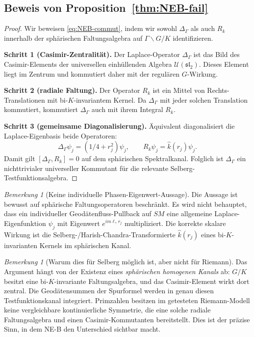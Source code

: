 \documentclass[12pt,a4paper]{article}
\theoremstyle{definition}
\theoremstyle{remark}
\newtheorem{remark}[theorem]{Bemerkung}
\newcommand{\Delop}{\Delta_{\Gamma}}
\begin{document}
\subsection{\texorpdfstring{Beweis von Proposition~\ref{thm:NEB-fail}}{Beweis von Proposition 5.1}}

\begin{proof}
Wir beweisen \eqref{eq:NEB-commut}, indem wir sowohl $\Delop$ als auch $R_k$
innerhalb der sphärischen Faltungsalgebra auf $\Gamma\backslash G/K$
identifizieren.

\smallskip\noindent
\textbf{Schritt 1 (Casimir-Zentralität).} Der Laplace-Operator $\Delop$ ist
das Bild des Casimir-Elements der universellen einhüllenden Algebra
$\mathcal{U}(\mathfrak{sl}_2)$. Dieses Element liegt im Zentrum und kommutiert
daher mit der regulären $G$-Wirkung.

\smallskip\noindent
\textbf{Schritt 2 (radiale Faltung).} Der Operator $R_k$ ist ein Mittel von
Rechts-Translationen mit bi-$K$-invariantem Kernel. Da $\Delop$ mit jeder
solchen Translation kommutiert, kommutiert $\Delop$ auch mit ihrem Integral
$R_k$.

\smallskip\noindent
\textbf{Schritt 3 (gemeinsame Diagonalisierung).} Äquivalent diagonalisiert die
Laplace-Eigenbasis beide Operatoren:
\[
\Delop\psi_j=(1/4+r_j^2)\psi_j,\qquad R_k\psi_j=\widehat{k}(r_j)\psi_j.
\]
Damit gilt $[\Delop,R_k]=0$ auf dem sphärischen Spektralkanal. Folglich ist
$\Delop$ ein nichttrivialer universeller Kommutant für die relevante
Selberg-Testfunktionsalgebra.
\end{proof}

\begin{remark}[Keine individuelle Phasen-Eigenwert-Aussage]
Die Aussage ist bewusst auf sphärische Faltungsoperatoren beschränkt.  Es wird
nicht behauptet, dass ein individueller Geodätenfluss-Pullback auf $SM$ eine
allgemeine Laplace-Eigenfunktion $\psi_j$ mit Eigenwert
$e^{im\ell_\gamma r_j}$ multipliziert.  Die korrekte skalare Wirkung ist die
Selberg-/Harish-Chandra-Transformierte $\widehat{k}(r_j)$ eines bi-$K$-invarianten
Kernels im sphärischen Kanal.
\end{remark}

\begin{remark}[Warum dies für Selberg möglich ist, aber nicht für Riemann]
Das Argument hängt von der Existenz eines \emph{sphärischen homogenen Kanals}
ab: $G/K$ besitzt eine bi-$K$-invariante Faltungsalgebra, und das Casimir-Element
wirkt dort zentral.  Die Geodätensummen der Spurformel werden in genau diesen
Testfunktionskanal integriert. Primzahlen besitzen im getesteten Riemann-Modell
keine vergleichbare kontinuierliche Symmetrie, die eine solche radiale
Faltungsalgebra und einen Casimir-Kommutanten bereitstellt. Dies ist der
präzise Sinn, in dem NE-B den Unterschied sichtbar macht.
\end{remark}
\end{document}
